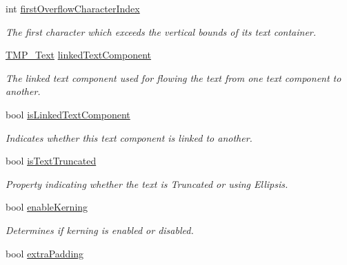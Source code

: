 \begin{DoxyCompactItemize}
int \mbox{\hyperlink{class_t_m_pro_1_1_t_m_p___text_a41e1120f3d5667fbe6ad537937a579fa}{first\+Overflow\+Character\+Index}}
\begin{DoxyCompactList}\small\item\em The first character which exceeds the vertical bounds of its text container. \end{DoxyCompactList}\item 
\mbox{\hyperlink{class_t_m_pro_1_1_t_m_p___text}{T\+M\+P\+\_\+\+Text}} \mbox{\hyperlink{class_t_m_pro_1_1_t_m_p___text_acc715707a9f18f41f87ef2944b9ea6fa}{linked\+Text\+Component}}
\begin{DoxyCompactList}\small\item\em The linked text component used for flowing the text from one text component to another. \end{DoxyCompactList}\item 
bool \mbox{\hyperlink{class_t_m_pro_1_1_t_m_p___text_ae3c8b615e7605495fa172a197140bb8b}{is\+Linked\+Text\+Component}}
\begin{DoxyCompactList}\small\item\em Indicates whether this text component is linked to another. \end{DoxyCompactList}\item 
bool \mbox{\hyperlink{class_t_m_pro_1_1_t_m_p___text_a421968a0cfbeaa535821900d0ee1f203}{is\+Text\+Truncated}}
\begin{DoxyCompactList}\small\item\em Property indicating whether the text is Truncated or using Ellipsis. \end{DoxyCompactList}\item 
bool \mbox{\hyperlink{class_t_m_pro_1_1_t_m_p___text_aa5ed53b59c07df2638065f155edc94c1}{enable\+Kerning}}
\begin{DoxyCompactList}\small\item\em Determines if kerning is enabled or disabled. \end{DoxyCompactList}\item 
bool \mbox{\hyperlink{class_t_m_pro_1_1_t_m_p___text_aa06b7d7a7054e899c0be4fa8ed9943b5}{extra\+Padding}}

\end{DoxyCompactItemize}
